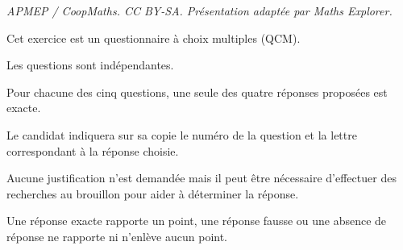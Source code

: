 \documentclass[10pt]{article}
\begin{document}
\noindent\textit{APMEP / CoopMaths. CC BY-SA. Présentation adaptée par Maths Explorer.}\par\medskip
\medskip

Cet exercice est un questionnaire à choix multiples (QCM). 

Les  questions sont indépendantes.

Pour chacune des cinq questions, une seule des quatre réponses proposées est exacte.

Le candidat indiquera sur sa copie le numéro de la question et la lettre correspondant à la
réponse choisie.

Aucune justification n’est demandée mais il peut être nécessaire d’effectuer des recherches
au brouillon pour aider à déterminer la réponse.

Une réponse exacte rapporte un point, une réponse fausse ou une absence de réponse ne rapporte ni n’enlève aucun point.

\medskip
\end{document}

